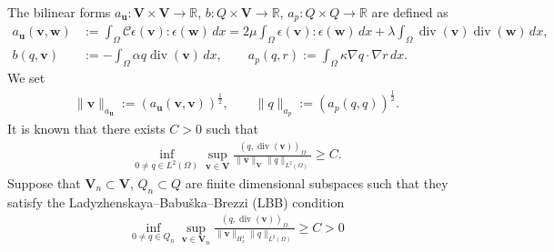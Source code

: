 \documentclass{amsart}
\newcommand{\dive}{\operatorname{div}}
\begin{document}
The bilinear forms $a_{\boldsymbol{u}}:\boldsymbol{V} \times \boldsymbol{V} \rightarrow \mathbb{R}$, $b:Q \times \boldsymbol{V} \rightarrow \mathbb{R}$, $a_p:Q \times Q \to \mathbb{R}$ are defined as
%
	\begin{align*}
		a_{\boldsymbol{u}}(\boldsymbol{v}, \boldsymbol{w}) &:= \int_{\Omega} \boldsymbol{\mathcal{C}} \epsilon(\boldsymbol{v}) : \epsilon(\boldsymbol{w}) \,dx = 2\mu \int_{\Omega} \epsilon(\boldsymbol{v}) : \epsilon(\boldsymbol{w}) \,dx + \lambda \int_{\Omega} \dive( \boldsymbol{v}) \dive( \boldsymbol{w}) \,dx,
        \\
		b(q,\boldsymbol{v}) &:= - \int_{\Omega} \alpha q \dive( \boldsymbol{v}) \,dx, 
        \qquad a_p(q,r) := \int_{\Omega} \kappa \nabla q \cdot \nabla r \,dx.
	\end{align*}
%
We set 
%
\begin{align}
    \| \boldsymbol{v}\|_{a_{\boldsymbol{u}}} := (a_{\boldsymbol{u}} (\boldsymbol{v}, \boldsymbol{v}))^{\frac 12}, \qquad     \| q\|_{a_{p}} := (a_{p} (q, q))^{\frac 12}.
\end{align}
%
It is known that there exists $C>0$ such that 
%
\begin{align}
	\label{eq:continuous-inf-sup}
	\inf_{0\not = q \in L^2(\Omega) } \sup_{\boldsymbol{v}\in \boldsymbol{V}} \frac{ (q,  \dive( \boldsymbol{v}))_{\Omega} }{{\|\boldsymbol{v}\|_{\boldsymbol{V}}\|q\|_{L^2(\Omega)}}} \ge C.
\end{align}
%
Suppose that $\boldsymbol{V}_n \subset \boldsymbol{V}$, $Q_n \subset Q$ are finite dimensional subspaces such that they satisfy the Ladyzhenskaya--Babu\v{s}ka--Brezzi (LBB) condition 
%
\begin{align}
	\label{eq:galerkin-inf-sup}
	\inf_{0\not = q \in Q_n } \sup_{\boldsymbol{v}\in \boldsymbol{V}_n} \frac{ (q,  \dive( \boldsymbol{v}))_{\Omega} }{{\|\boldsymbol{v}\|_{H_x^1}\|q\|_{L^2(\Omega)}}} \ge C >0
\end{align}
\end{document}

